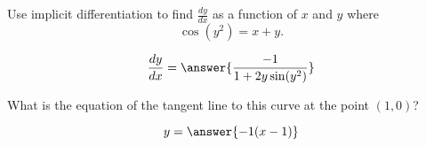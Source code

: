 \documentclass{ximera}
\author{Steven Gubkin}
\begin{document}
\begin{exercise}

Use implicit differentiation to find $\frac{dy}{dx}$ as a function of $x$ and $y$ where
\[
\cos(y^2) = x+y.
\]
\begin{prompt}
\[
\frac{dy}{dx} = \answer{\frac{-1}{1+2y\sin(y^2)}}
\]
\end{prompt}
What is the equation of the tangent line to this curve at the point $(1,0)$?
\begin{prompt}
\[
y = \answer{-1(x-1)}
\]
\end{prompt}
\end{exercise}
\end{document}
